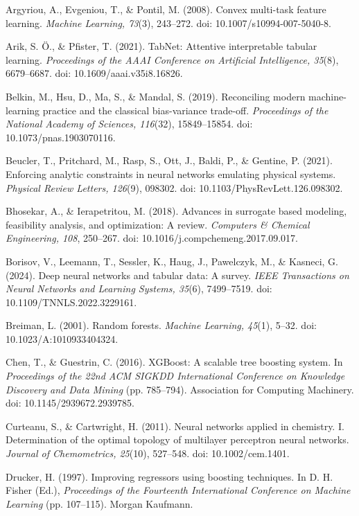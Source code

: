 \documentclass[a4paper,fleqn]{cas-sc}
\begin{document}
\noindent Argyriou, A., Evgeniou, T., \& Pontil, M. (2008). Convex multi-task feature learning. \textit{Machine Learning, 73}(3), 243--272. doi: 10.1007/s10994-007-5040-8.

\noindent Arik, S. \"O., \& Pfister, T. (2021). TabNet: Attentive interpretable tabular learning. \textit{Proceedings of the AAAI Conference on Artificial Intelligence, 35}(8), 6679--6687. doi: 10.1609/aaai.v35i8.16826.

\noindent Belkin, M., Hsu, D., Ma, S., \& Mandal, S. (2019). Reconciling modern machine-learning practice and the classical bias-variance trade-off. \textit{Proceedings of the National Academy of Sciences, 116}(32), 15849--15854. doi: 10.1073/pnas.1903070116.

\noindent Beucler, T., Pritchard, M., Rasp, S., Ott, J., Baldi, P., \& Gentine, P. (2021). Enforcing analytic constraints in neural networks emulating physical systems. \textit{Physical Review Letters, 126}(9), 098302. doi: 10.1103/PhysRevLett.126.098302.

\noindent Bhosekar, A., \& Ierapetritou, M. (2018). Advances in surrogate based modeling, feasibility analysis, and optimization: A review. \textit{Computers \& Chemical Engineering, 108}, 250--267. doi: 10.1016/j.compchemeng.2017.09.017.

\noindent Borisov, V., Leemann, T., Sessler, K., Haug, J., Pawelczyk, M., \& Kasneci, G. (2024). Deep neural networks and tabular data: A survey. \textit{IEEE Transactions on Neural Networks and Learning Systems, 35}(6), 7499--7519. doi: 10.1109/TNNLS.2022.3229161.

\noindent Breiman, L. (2001). Random forests. \textit{Machine Learning, 45}(1), 5--32. doi: 10.1023/A:1010933404324.

\noindent Chen, T., \& Guestrin, C. (2016). XGBoost: A scalable tree boosting system. In \textit{Proceedings of the 22nd ACM SIGKDD International Conference on Knowledge Discovery and Data Mining} (pp. 785--794). Association for Computing Machinery. doi: 10.1145/2939672.2939785.

\noindent Curteanu, S., \& Cartwright, H. (2011). Neural networks applied in chemistry. I. Determination of the optimal topology of multilayer perceptron neural networks. \textit{Journal of Chemometrics, 25}(10), 527--548. doi: 10.1002/cem.1401.

\noindent Drucker, H. (1997). Improving regressors using boosting techniques. In D. H. Fisher (Ed.), \textit{Proceedings of the Fourteenth International Conference on Machine Learning} (pp. 107--115). Morgan Kaufmann.
\end{document}
